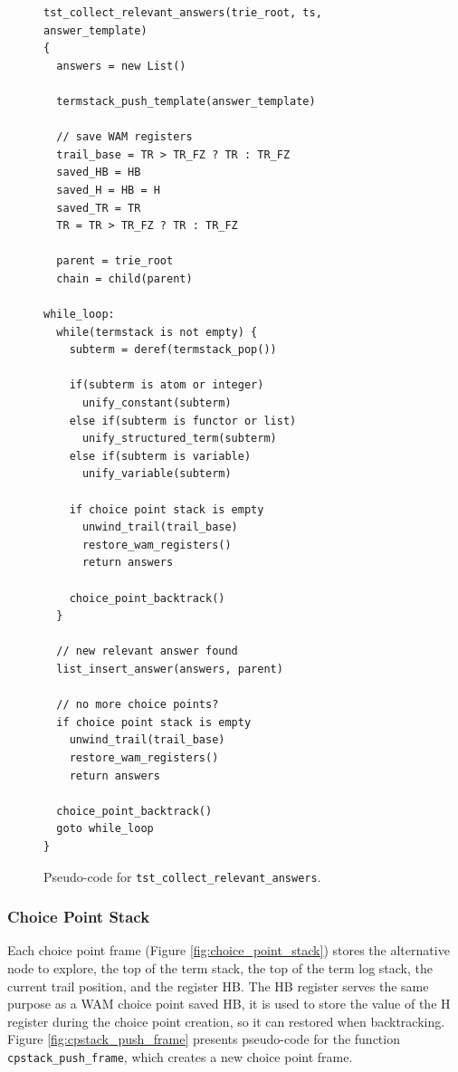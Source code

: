 \begin{figure}[ht]
\begin{Verbatim}[fontsize=\small]
tst_collect_relevant_answers(trie_root, ts, answer_template)
{
  answers = new List()
  
  termstack_push_template(answer_template)
  
  // save WAM registers
  trail_base = TR > TR_FZ ? TR : TR_FZ
  saved_HB = HB
  saved_H = HB = H
  saved_TR = TR
  TR = TR > TR_FZ ? TR : TR_FZ
  
  parent = trie_root
  chain = child(parent)
  
while_loop:
  while(termstack is not empty) {
    subterm = deref(termstack_pop())
    
    if(subterm is atom or integer)
      unify_constant(subterm)
    else if(subterm is functor or list)
      unify_structured_term(subterm)
    else if(subterm is variable)
      unify_variable(subterm)
      
    if choice point stack is empty
      unwind_trail(trail_base)
      restore_wam_registers()
      return answers
    
    choice_point_backtrack()
  }
  
  // new relevant answer found
  list_insert_answer(answers, parent)
  
  // no more choice points?
  if choice point stack is empty
    unwind_trail(trail_base)
    restore_wam_registers()
    return answers
    
  choice_point_backtrack()
  goto while_loop
}
\end{Verbatim}
\caption{Pseudo-code for \texttt{tst\_collect\_relevant\_answers}.}
\label{fig:tst_collect_relevant_answers}
\end{figure}

\subsubsection{Choice Point Stack}

Each choice point frame (Figure \ref{fig:choice_point_stack}) stores the alternative node to explore, the top of the term stack, the top of the term log stack, the current trail position, and the register HB. The HB register serves the same purpose as a WAM choice point saved HB, it is used to store the value of the H register during the choice point creation, so it can restored when backtracking. Figure \ref{fig:cpstack_push_frame} presents pseudo-code for the function \texttt{cpstack\_push\_frame}, which creates a new choice point frame.

